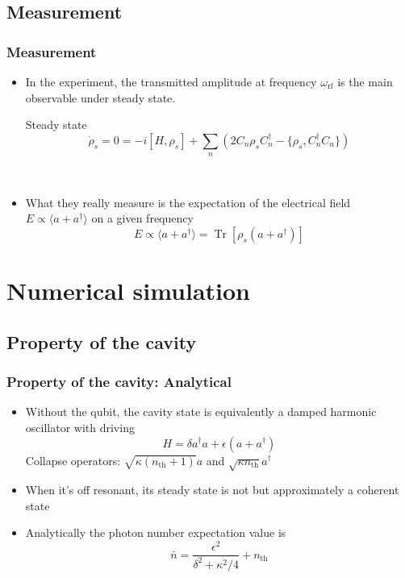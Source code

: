 \documentclass[xcolor=dvipsnames,hyperref={CJKbookmarks=true}]{beamer}
\newcommand{\rf}{\text{rf}}
\newcommand{\thm}{\text{th}}
\DeclareMathOperator{\Tr}{Tr}
\begin{document}
\subsection{Measurement}
\begin{frame}[t]\frametitle{Measurement}
	\begin{itemize}
		\item In the experiment, the transmitted amplitude at frequency $\omega_{\rf}$ is the main observable under steady state. 
	\begin{block}{Steady state}
	$$
	\dot\rho_s = 0 = -i[H, \rho_{s}] + \sum_n \left(2C_n \rho_s C_n^\dag - 
	\{\rho_s, C_n^\dag C_n\}\right)
	$$
	\end{block}
	~

		\item What they really measure is the expectation of the 
		electrical field $E\propto\langle a + a^\dag \rangle$ \cite{schuster2007circuit} on a given frequency
	$$
	E\propto \langle a + a^\dag \rangle = \Tr [\rho_{s}(a+a^\dag)]
	$$
	\end{itemize}
\end{frame}

\section{Numerical simulation}
\subsection{Property of the cavity}
\begin{frame}[t]\frametitle{Property of the cavity: Analytical}
\begin{itemize}
	\item Without the qubit, the cavity state is equivalently a damped harmonic oscillator with driving
	$$
	 H = \delta a^\dag a + \epsilon (a + a^\dag)
	$$
	Collapse operators: $\sqrt{\kappa(n_{\thm}+1)}a$ and 
	$\sqrt{\kappa n_{\thm}}a^\dag$
	\item When it's off resonant, its steady state is not but approximately a coherent state
	\item Analytically the photon number expectation value is 
	$$
	\bar n = \frac{\epsilon^2}{\delta^2 + \kappa^2/4} + n_{\thm}
	$$
\end{itemize}
\end{frame}
\end{document}
